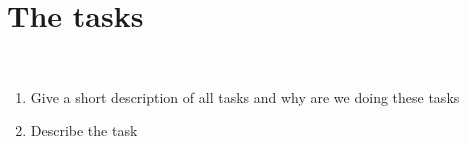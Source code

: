 \section{The tasks}\label{sec:task}
\
\begin{enumerate}[i]
	\item Give a short description of all tasks and why are we doing these tasks
	\item Describe the task
\end{enumerate}
